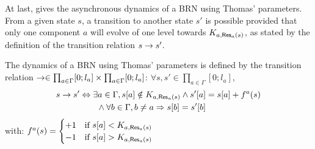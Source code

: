 
At last,  gives the asynchronous dynamics of a BRN using Thomas' parameters.
From a given state $s$, a transition to another state $s'$ is possible provided that only one component $a$ will evolve of one level towards $K_{a,\mathsf{Res}_{a}(s)}$,
as stated by the definition of the transition relation $s \rightarrow s'$.

\begin{definition}\label{def:dynamics}
The dynamics of a BRN using Thomas' parameters is defined by the transition relation $\rightarrow \in \prod_{a \in \Gamma} [0;l_a] \times \prod_{a \in \Gamma} [0;l_a]$:
$\forall s, s' \in \prod_{a \in \Gamma} [0;l_a]$,
\begin{align*}
s \rightarrow s' &\Leftrightarrow \exists a \in \Gamma, {s[a]} \notin K_{a, \mathsf{Res}_{a}(s)} \wedge {s'[a]} = {s[a]} + f^a(s) \\
  & \qquad \wedge \forall b \in \Gamma, b \neq a \Rightarrow {s[b]} = {s'[b]}
\end{align*}
with: $f^a(s) = 
  \begin{cases}
    +1 & \text{if } {s[a]} < K_{a, \mathsf{Res}_{a}(s)} \\
    -1 & \text{if } {s[a]} > K_{a, \mathsf{Res}_{a}(s)} \\
  \end{cases}$
\begin{comment}
Let $s$ be a state of a BRN using Thomas' parameters $(\IG, K)$ where $\IG = (\Gamma, E_+, E_-)$.
The state that succeeds to $s$ is given by the indeterministic function $f(s)$:
\begin{align*}
  f(s)  & = s' \Leftrightarrow \exists a \in \Gamma,
    \GRNget{s'}{a} = f^a(s) \wedge
    \forall b \in \Gamma, b \neq a, \GRNget{s}{b} = \GRNget{s'}{b}
    \quad\text{, with}\\
  f^a(s) & =
  \begin{cases}
    \GRNget{s}{a} + 1 & \text{if } \GRNget{s}{a} < K_{a,A,B} \\%
    \GRNget{s}{a} & \text{if } \GRNget{s}{a} \in K_{a,A,B} \\ %
    \GRNget{s}{a} - 1 & \text{if } \GRNget{s}{a} > K_{a,A,B} %
  \end{cases}
\quad\text{, where $A,B=\GRNres{a}{s}$.}
\end{align*}
\end{comment}
\end{definition}

